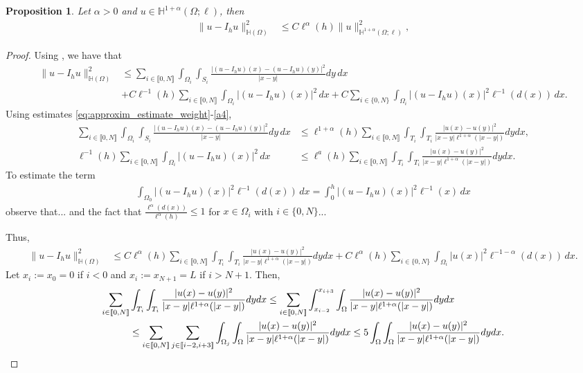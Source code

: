 \documentclass[11 pt]{article}
\newcommand\inter[1]{\llbracket #1\rrbracket}
\newtheorem{proposition}[theorem]{Proposition}
\numberwithin{equation}{section}
\newcommand{\weH}[1]{\mathbb H^{#1}(\Omega;\ell)}
\begin{document}
\begin{proposition}\label{prop:est_interpolator}
Let $\alpha>0$ and $u\in\weH{1+\alpha}$, then
\begin{align}\label{eq:interp_final}
    \|u-I_hu\|^2_{\mathbb H(\Omega)}&\leq C\ell^{\alpha}(h) \|u\|^2_{\mathbb H^{1+\alpha}(\Omega;\ell)},
\end{align}
\end{proposition}
\begin{proof}
Using , we have that
\begin{align*}
    \|u-I_h u\|^2_{\mathbb H(\Omega)}
    &\leq \sum_{i\in\inter{0,N}}\int_{\Omega_i}\int_{S_i}\frac{|(u-I_h u)(x)-(u-I_h u)(y)|^2}{|x-y|}dy\,dx\\
    &+C\ell^{-1}(h)\sum_{i\in\inter{0,N}}\int_{\Omega_i}|(u-I_h u)(x)|^2\,dx +C\sum_{i\in\{0,N\}}\int_{\Omega_i}|(u-I_h u)(x)|^2\ell^{-1}(d(x))\,dx.
\end{align*}
Using estimates \eqref{eq:approxim_estimate_weight}-\eqref{a4},
\begin{align*}
 \sum_{i\in\inter{0,N}}\int_{\Omega_i}\int_{S_i}\frac{|(u-I_h u)(x)-(u-I_h u)(y)|^2}{|x-y|}dy\,dx &\leq
 \ell^{1+\alpha}(h)\sum_{i\in\inter{0,N}}\int_{T_i}\int_{T_i}\frac{|u(x)-u(y)|^2}{|x-y|\ell^{1+\alpha}(|x-y|)}dy dx,
 \\
\ell^{-1}(h)\sum_{i\in\inter{0,N}}\int_{\Omega_i}|(u-I_h u)(x)|^2\,dx &\leq \ell^{a}(h)\sum_{i\in\inter{0,N}}\int_{T_i}\int_{T_i}\frac{|u(x)-u(y)|^2}{|x-y|\ell^{1+\alpha}(|x-y|)}dy dx.
\end{align*}
To estimate the term
\begin{align*}
 \int_{\Omega_0}|(u-I_h u)(x)|^2\ell^{-1}(d(x))\,dx
 =\int_{0}^h|(u-I_h u)(x)|^2\ell^{-1}(x)\,dx
\end{align*}
observe that... and the fact that $\frac{\ell^{\alpha}(d(x))}{\ell^{\alpha}(h)}\leq 1$ for $x\in\Omega_i$ with $i\in\{0,N\}$...


Thus,
%
\begin{align}
    \|u-I_h u\|^2_{\mathbb H(\Omega)}&\leq
    C \ell^{\alpha}(h)\sum_{i\in\inter{0,N}}\int_{T_i}\int_{T_i}\frac{|u(x)-u(y)|^2}{|x-y|\ell^{1+\alpha}(|x-y|)}dy dx+C\ell^{\alpha}(h)\sum_{i\in\{0,N\}}\int_{\Omega_i}|u(x)|^2\ell^{-1-\alpha}(d(x))\,dx.\label{eq:est_aprox_sum}
\end{align}
Let $x_i:=x_0=0$ if $i<0$ and $x_i:=x_{N+1}=L$ if $i>N+1$.  Then,
%
\begin{align}\notag
   \sum_{i\in\inter{0,N}} &\int_{T_i}\int_{T_i}\frac{|u(x)-u(y)|^2}{|x-y|\ell^{1+\alpha}(|x-y|)}dy dx
   \leq \sum_{i\in\inter{0,N}} \int_{x_{i-2}}^{x_{i+3}}\int_{\Omega}\frac{|u(x)-u(y)|^2}{|x-y|\ell^{1+\alpha}(|x-y|)}dy dx\notag\\
   &\leq \sum_{i\in\inter{0,N}} \sum_{j\in \inter{i-2,i+3}}\int_{\Omega_j}\int_{\Omega}\frac{|u(x)-u(y)|^2}{|x-y|\ell^{1+\alpha}(|x-y|)}dy dx\leq 5\int_{\Omega}\int_{\Omega} \frac{|u(x)-u(y)|^2}{|x-y|\ell^{1+\alpha}(|x-y|)}dy dx. \label{eq:est_aprox_omega}
\end{align}


\end{proof}
\end{document}
